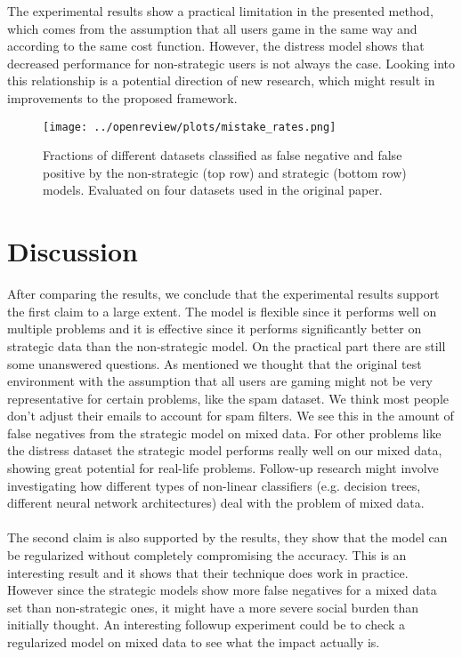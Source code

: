 The experimental results show a practical limitation in the presented method, which comes from the assumption that all users game in the same way and according to the same cost function. However, the distress model shows that decreased performance for non-strategic users is not always the case. Looking into this relationship is a potential direction of new research, which might result in improvements to the proposed framework.

\begin{figure}[H]
    \centering
    \texttt{[image: ../openreview/plots/mistake\_rates.png]}
    \caption{Fractions of different datasets classified as false negative and false positive by the non-strategic (top row) and strategic (bottom row) models. Evaluated on four datasets used in the original paper. }
    \label{fig:confusion}
\end{figure}

\section{Discussion}
After comparing the results, we conclude that the experimental results support the first claim to a large extent. The model is flexible since it performs well on multiple problems and it is effective since it performs significantly better on strategic data than the non-strategic model. On the practical part there are still some unanswered questions. As mentioned we thought that the original test environment with the assumption that all users are gaming might not be very representative for certain problems, like the spam dataset. We think most people don't adjust their emails to account for spam filters. We see this in the amount of false negatives from the strategic model on mixed data. For other problems like the distress dataset the strategic model performs really well on our mixed data, showing great potential for real-life problems. Follow-up research might involve investigating how different types of non-linear classifiers (e.g. decision trees, different neural network architectures) deal with the problem of mixed data.\\
\\
The second claim is also supported by the results, they show that the model can be regularized without completely compromising the accuracy. This is an interesting result and it shows that their technique does work in practice. However since the strategic models show more false negatives for a mixed data set than non-strategic ones, it might have a more severe social burden than initially thought. An interesting followup experiment could be to check a regularized model on mixed data to see what the impact actually is.

